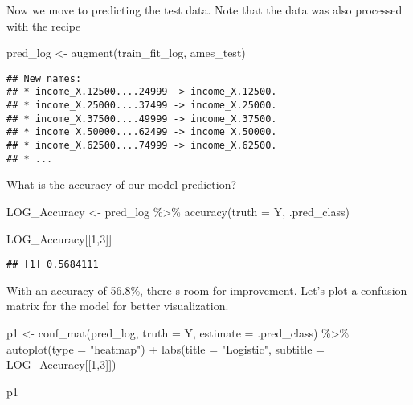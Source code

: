 \documentclass[
]{article}
\newenvironment{Shaded}{\begin{snugshade}}{\end{snugshade}}
\newcommand{\AttributeTok}[1]{\textcolor[rgb]{0.77,0.63,0.00}{#1}}
\newcommand{\DecValTok}[1]{\textcolor[rgb]{0.00,0.00,0.81}{#1}}
\newcommand{\FunctionTok}[1]{\textcolor[rgb]{0.00,0.00,0.00}{#1}}
\newcommand{\NormalTok}[1]{#1}
\newcommand{\OtherTok}[1]{\textcolor[rgb]{0.56,0.35,0.01}{#1}}
\newcommand{\SpecialCharTok}[1]{\textcolor[rgb]{0.00,0.00,0.00}{#1}}
\newcommand{\StringTok}[1]{\textcolor[rgb]{0.31,0.60,0.02}{#1}}
\begin{document}
Now we move to predicting the test data. Note that the data was also
processed with the recipe

\begin{Shaded}
\begin{Highlighting}[]
\NormalTok{pred\_log }\OtherTok{\textless{}{-}} \FunctionTok{augment}\NormalTok{(train\_fit\_log, ames\_test)}
\end{Highlighting}
\end{Shaded}

\begin{verbatim}
## New names:
## * income_X.12500....24999 -> income_X.12500.
## * income_X.25000....37499 -> income_X.25000.
## * income_X.37500....49999 -> income_X.37500.
## * income_X.50000....62499 -> income_X.50000.
## * income_X.62500....74999 -> income_X.62500.
## * ...
\end{verbatim}

What is the accuracy of our model prediction?

\begin{Shaded}
\begin{Highlighting}[]
\NormalTok{LOG\_Accuracy }\OtherTok{\textless{}{-}}\NormalTok{ pred\_log }\SpecialCharTok{\%\textgreater{}\%} 
  \FunctionTok{accuracy}\NormalTok{(}\AttributeTok{truth =}\NormalTok{ Y, .pred\_class)}

\NormalTok{LOG\_Accuracy[[}\DecValTok{1}\NormalTok{,}\DecValTok{3}\NormalTok{]]}
\end{Highlighting}
\end{Shaded}

\begin{verbatim}
## [1] 0.5684111
\end{verbatim}

With an accuracy of 56.8\%, there s room for improvement. Let's plot a
confusion matrix for the model for better visualization.

\begin{Shaded}
\begin{Highlighting}[]
\NormalTok{p1 }\OtherTok{\textless{}{-}} \FunctionTok{conf\_mat}\NormalTok{(pred\_log, }\AttributeTok{truth =}\NormalTok{ Y, }\AttributeTok{estimate =}\NormalTok{ .pred\_class) }\SpecialCharTok{\%\textgreater{}\%} 
  \FunctionTok{autoplot}\NormalTok{(}\AttributeTok{type =} \StringTok{"heatmap"}\NormalTok{) }\SpecialCharTok{+}
  \FunctionTok{labs}\NormalTok{(}\AttributeTok{title =} \StringTok{"Logistic"}\NormalTok{,}
       \AttributeTok{subtitle =}\NormalTok{ LOG\_Accuracy[[}\DecValTok{1}\NormalTok{,}\DecValTok{3}\NormalTok{]])}

\NormalTok{p1}
\end{Highlighting}
\end{Shaded}
\end{document}
